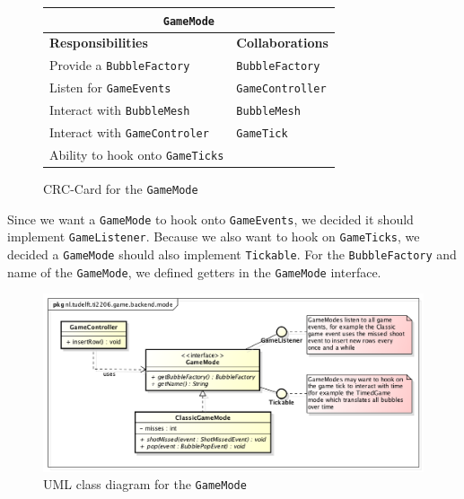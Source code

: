 \documentclass[a4paper]{article}
\begin{document}
\begin{figure}[H]
    \begin{center}
    \begin{tabular}{ | p{8cm} | p{4cm} | }
      \multicolumn{2}{c}{\texttt{GameMode}} \\ \hline
      \textbf{Responsibilities} & \textbf{Collaborations} \\ \hline
      Provide a \texttt{BubbleFactory} & \texttt{BubbleFactory} \\
      Listen for \texttt{GameEvents} & \texttt{GameController} \\
      Interact with \texttt{BubbleMesh} & \texttt{BubbleMesh} \\
      Interact with \texttt{GameControler} & \texttt{GameTick} \\
      Ability to hook onto \texttt{GameTicks} & \\
      \hline
    \end{tabular}
    \end{center}
    \caption{CRC-Card for the \texttt{GameMode}}
\end{figure}

Since we want a \texttt{GameMode} to hook onto \texttt{GameEvents}, we decided it should implement \texttt{GameListener}. Because we also want to hook on \texttt{GameTicks}, we decided a \texttt{GameMode} should also implement \texttt{Tickable}. For the \texttt{BubbleFactory} and name of the \texttt{GameMode}, we defined getters in the \texttt{GameMode} interface.

\begin{figure}[H]
	\centering
	\includegraphics[scale=0.5]{GameMode.png}
    \caption{UML class diagram for the \texttt{GameMode}}
\end{figure}
\end{document}
